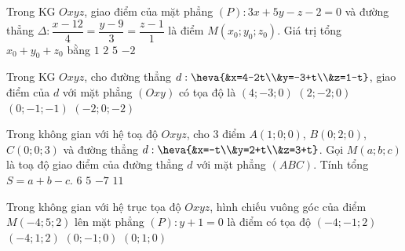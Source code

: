 \begin{ex}%
Trong KG $Oxyz$, giao điểm của mặt phẳng $(P):3x+5y-z-2=0$ và đường thẳng $\Delta:\dfrac{x-12}{4}=\dfrac{y-9}{3}=\dfrac{z-1}{1}$ là điểm $M\left(x_0;y_0;z_0\right)$. Giá trị tổng $x_0+y_0+z_0$ bằng
\choice
{$1$}
{$2$}
{$5$}
{\True $-2$}
\end{ex}

\begin{ex}%
Trong KG $Oxyz$, cho đường thẳng $d:\heva{&x=4-2t\\&y=-3+t\\&z=1-t}$, giao điểm của $d$ với mặt phẳng $(Oxy)$ có tọa độ là
\choice
{$(4;-3;0)$}
{\True $(2;-2;0)$}
{$(0;-1;-1)$}
{$(-2;0;-2)$}
\end{ex}

\begin{ex}%
Trong không gian với hệ toạ độ $Oxyz$, cho $3$ điểm $A(1;0;0)$, $B(0;2;0)$, $C(0;0;3)$ và đường thẳng $d:\heva{&x=-t\\&y=2+t\\&z=3+t}$. Gọi $M(a;b;c)$ là toạ độ giao điểm của đường thẳng $d$ với mặt phẳng $(ABC)$. Tính tổng $S=a+b-c$.
\choice
{$6$}
{$5$}
{\True $-7$}
{$11$}
\end{ex}

\begin{ex}%
Trong không gian với hệ trục tọa độ $Oxyz$, hình chiếu vuông góc của điểm $M(-4;5;2)$ lên mặt phẳng $(P):y+1=0$ là điểm có tọa độ
\choice
{\True $(-4;-1;2)$}
{$(-4;1;2)$}
{$(0;-1;0)$}
{$(0;1;0)$}
\end{ex}

